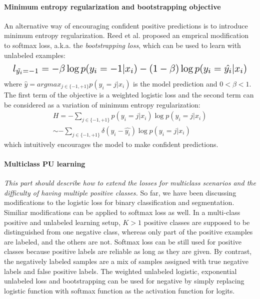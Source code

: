 \paragraph{Minimum entropy regularization and bootstrapping objective}
\noindent
An alternative way of encouraging confident positive predictions is to introduce minimum entropy regularization\cite{grandvalet2005semi}.
Reed et al.\cite{reed2014training} proposed an emprical modification to softmax loss, a.k.a. the \textit{bootstrapping loss}, which can be used to learn with unlabeled examples:
\begin{equation*}
\resizebox{\columnwidth}{!}{
  $l_{\tilde{y_i}=-1} = - \beta \log p(y_i=-1 \vert x_i) - (1-\beta) \log p(y_i=\hat{y_i} \vert x_i)$
}
\end{equation*}
where $\hat{y} = argmax_{j\in\{-1,+1\}}p(y_i=j \vert x_i)$ is the model prediction and $0<\beta<1$.
The first term of the objective is a weighted logistic loss and the second term can be considered as a variation of minimum entropy regularization:
\begin{equation*}
  \begin{aligned}
    H = - \sum_{j\in\{-1,+1\}} p(y_i=j \vert x_i) \log p(y_i=j \vert x_i) \\
    \sim - \sum_{j\in\{-1,+1\}} \delta(y_i - \hat{y_i}) \log p(y_i=j \vert x_i)
  \end{aligned}
\end{equation*}
which intuitively encourages the model to make confident predictions\cite{grandvalet2005semi}.

\paragraph{Multiclass PU learning}
\noindent \textit{This part should describe how to extend the losses for multiclass scenarios and the difficulty of having multiple positive classes.}
So far, we have been discussing modifications to the logistic loss for binary classification and segmentation.
Similiar modifications can be applied to softmax loss as well.
In a multi-class positive and unlabeled learning setup, $K>1$ positive classes are supposed to be distinguished from one negative class, whereas only part of the positive examples are labeled, and the others are not.
Softmax loss can be still used for positive classes because positive labels are reliable as long as they are given.
By contrast, the negatively labeled samples are a mix of samples assigned with true negative labels and false positive labels.
The weighted unlabeled logistic, exponential unlabeled loss and bootstrapping can be used for negative by simply replacing logistic function with softmax function as the activation function for logits.


